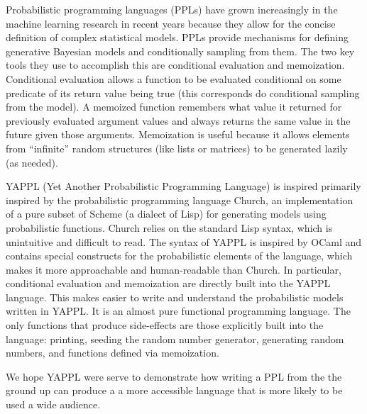 Probabilistic programming languages (PPLs) have grown increasingly in the machine learning research in recent years because they allow for the concise definition of complex statistical models. PPLs provide mechanisms for defining generative Bayesian models and conditionally sampling from them. The two key tools they use to accomplish this are conditional evaluation and memoization. Conditional evaluation allows a function to be evaluated conditional on some predicate of its return value being true (this corresponds do conditional sampling from the model). A memoized function remembers what value it returned for previously evaluated argument values and always returns the same value in the future given those arguments. Memoization is useful because it allows elements from ``infinite'' random structures (like lists or matrices) to be generated lazily (as needed). 

YAPPL (Yet Another Probabilistic Programming Language) is inspired primarily inspired by the probabilistic programming language Church, an implementation of a pure subset of Scheme (a dialect of Lisp) for generating models using probabilistic functions. Church relies on the standard Lisp syntax, which is unintuitive and difficult to read. The syntax of YAPPL is inspired by OCaml and contains special constructs for the probabilistic elements of the language, which makes it more approachable and human-readable than Church. In particular, conditional evaluation and memoization are directly built into the YAPPL language. This makes easier to write and understand the probabilistic models written in YAPPL. It is an almost pure functional programming language. The only functions that produce side-effects are those explicitly built into the language: printing, seeding the random number generator, generating random numbers, and functions defined via memoization. 

We hope YAPPL were serve to demonstrate how writing a PPL from the the ground up can produce a  a more accessible language that is more likely to be used a wide audience. 
 

